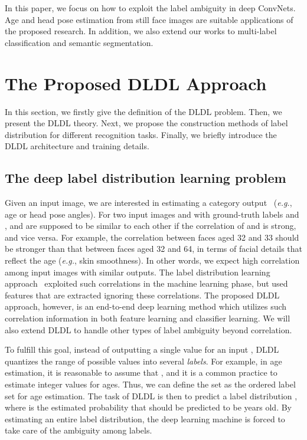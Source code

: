 \documentclass[journal]{IEEEtran}
\begin{document}
In this paper, we focus on how to exploit the label ambiguity in deep ConvNets. Age and head pose estimation from still face images are suitable applications of the proposed research. In addition, we also extend our works to multi-label classification and semantic segmentation.

\section{The Proposed DLDL Approach} \label{sec:pa}

In this section, we firstly give the definition of the DLDL problem. Then, we present the DLDL theory. Next, we propose the construction methods of label distribution for different recognition tasks. Finally, we briefly introduce the DLDL architecture and training details.

\subsection{The deep label distribution learning problem}

 Given an input image, we are interested in estimating a category output ~(\emph{e.g.}, age or head pose angles). For two input images  and  with ground-truth labels  and ,  and  are supposed to be similar to each other if the correlation of  and  is strong, and vice versa. For example, the correlation between faces aged 32 and 33 should be stronger than that between faces aged 32 and 64, in terms of facial details that reflect the age (\emph{e.g.}, skin smoothness). In other words, we expect high correlation among input images with similar outputs.
The label distribution learning approach~\cite{geng2013facial,geng2014head} exploited such correlations in the machine learning phase, but used features that are extracted ignoring these correlations. The proposed DLDL approach, however, is an end-to-end deep learning method which utilizes such correlation information in both feature learning and classifier learning. We will also extend DLDL to handle other types of label ambiguity beyond correlation.

To fulfill this goal, instead of outputting a single value  for an input , DLDL quantizes the range of possible  values into several \emph{labels}. For example, in age estimation, it is reasonable to assume that , and it is a common practice to estimate integer values for ages. Thus, we can define the set  as the ordered label set for age estimation. The task of DLDL is then to predict a label distribution , where  is the estimated probability that  should be predicted to be  years old. By estimating an entire label distribution, the deep learning machine is forced to take care of the ambiguity among labels.
\end{document}
